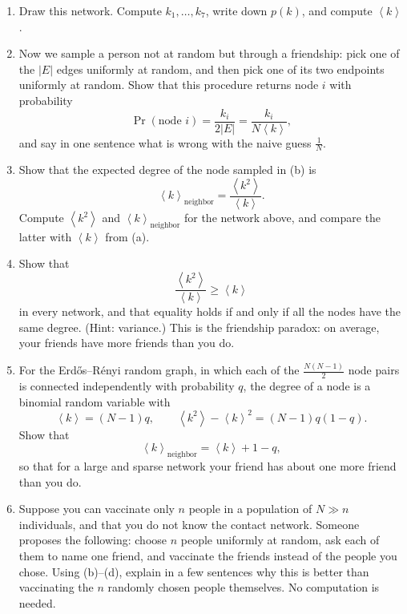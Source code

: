 \documentclass[a4paper,12pt]{article}
\begin{document}
\begin{enumerate}[label=(\alph*)]
\item Draw this network. Compute $k_1,\ldots,k_7$, write down $p(k)$, and compute $\left\langle k \right\rangle$.

\item Now we sample a person not at random but through a friendship: pick one of the $\left| E \right|$ edges uniformly at random, and then pick one of its two endpoints uniformly at random. Show that this procedure returns node $i$ with probability
\[ \Pr(\text{node } i) = \frac{k_i}{2\left| E \right|} = \frac{k_i}{N\left\langle k \right\rangle} , \]
and say in one sentence what is wrong with the naive guess $\frac{1}{N}$.

\item Show that the expected degree of the node sampled in (b) is
\[ \left\langle k \right\rangle_{\text{neighbor}} = \frac{\left\langle k^2 \right\rangle}{\left\langle k \right\rangle} . \]
Compute $\left\langle k^2 \right\rangle$ and $\left\langle k \right\rangle_{\text{neighbor}}$ for the network above, and compare the latter with $\left\langle k \right\rangle$ from (a).

\item Show that
\[ \frac{\left\langle k^2 \right\rangle}{\left\langle k \right\rangle} \geq \left\langle k \right\rangle \]
in every network, and that equality holds if and only if all the nodes have the same degree. (Hint: variance.) This is the friendship paradox: on average, your friends have more friends than you do.

\item For the Erd\H{o}s--R\'enyi random graph, in which each of the $\frac{N(N-1)}{2}$ node pairs is connected independently with probability $q$, the degree of a node is a binomial random variable with
\[ \left\langle k \right\rangle = (N-1)q,
\qquad
\left\langle k^2 \right\rangle - \left\langle k \right\rangle^2 = (N-1)q(1-q) . \]
Show that
\[ \left\langle k \right\rangle_{\text{neighbor}} = \left\langle k \right\rangle + 1 - q , \]
so that for a large and sparse network your friend has about one more friend than you do.

\item Suppose you can vaccinate only $n$ people in a population of $N \gg n$ individuals, and that you do not know the contact network. Someone proposes the following: choose $n$ people uniformly at random, ask each of them to name one friend, and vaccinate the friends instead of the people you chose. Using (b)--(d), explain in a few sentences why this is better than vaccinating the $n$ randomly chosen people themselves. No computation is needed.
\end{enumerate}
\end{document}
